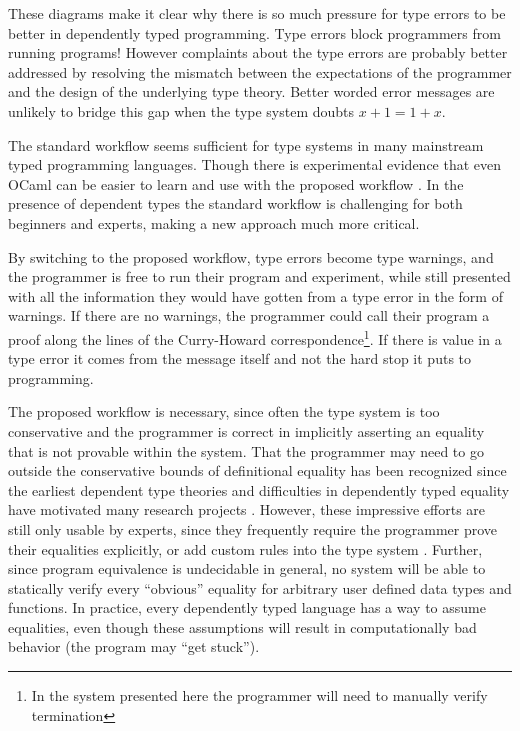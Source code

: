 These diagrams make it clear why there is so much pressure for type errors to be better in dependently typed programming\cite{eremondi2019framework}.
Type errors block programmers from running programs! However complaints about the type errors are probably better addressed by resolving the mismatch between the expectations of the programmer and the design of the underlying type theory.
Better worded error messages are unlikely to bridge this gap when the type system doubts $x+1=1+x$.

The standard workflow seems sufficient for type systems in many mainstream typed programming languages.
Though there is experimental evidence that even OCaml can be easier to learn and use with the proposed workflow \cite{10.1145/2951913.2951915}.
In the presence of dependent types the standard workflow is challenging for both beginners and experts, making a new approach much more critical.


By switching to the proposed workflow, type errors become type warnings, and the programmer is free to run their program and experiment, while still presented with all the information they would have gotten from a type error in the form of warnings.
If there are no warnings, the programmer could call their program a proof along the lines of the Curry-Howard correspondence\footnote{
  In the system presented here the programmer will need to manually verify termination
}.
If there is value in a type error it comes from the message itself and not the hard stop it puts to programming.

The proposed workflow is necessary, since often the type system is too conservative and the programmer is correct in implicitly asserting an equality that is not provable within the system.
That the programmer may need to go outside the conservative bounds of definitional equality has been recognized since the earliest dependent type theories \cite{Martin-Lof-1972} and difficulties in dependently typed equality have motivated many research projects \cite{HoTTbook,sjoberg2015programming,cockx2021taming}.
However, these impressive efforts are still only usable by experts, since they frequently require the programmer prove their equalities explicitly\cite{HoTTbook,sjoberg2015programming}, or add custom rules into the type system \cite{cockx2021taming}.
Further, since program equivalence is undecidable in general, no system will be able to statically verify every ``obvious'' equality for arbitrary user defined data types and functions.
In practice, every dependently typed language has a way to assume equalities, even though these assumptions will result in computationally bad behavior (the program may ``get stuck'').

